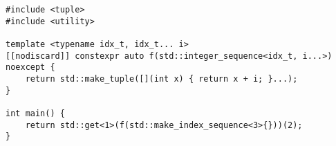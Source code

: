 \begin{lstlisting}[title=\href{https://godbolt.org/z/Jkuq5E}{\texttt{godbolt.org/z/Jkuq5E}}]
#include <tuple>
#include <utility>

template <typename idx_t, idx_t... i>
[[nodiscard]] constexpr auto f(std::integer_sequence<idx_t, i...>) noexcept {
    return std::make_tuple([](int x) { return x + i; }...);
}

int main() {
    return std::get<1>(f(std::make_index_sequence<3>{}))(2);
}
\end{lstlisting}
